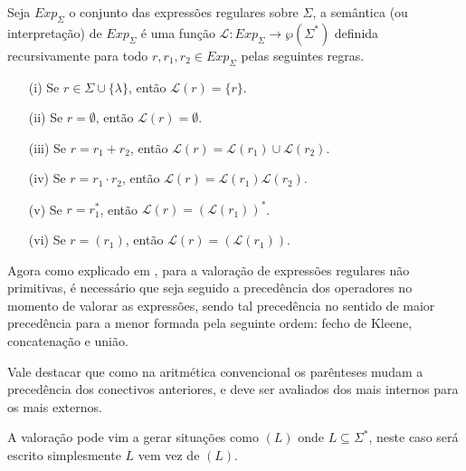 \begin{definition}\label{def:ExpRegularesSemantica}
	Seja $Exp_\Sigma$ o conjunto das expressões regulares sobre $\Sigma$,  a semântica (ou interpretação) de $Exp_\Sigma$ é uma função $\mathcal{L}: Exp_\Sigma \rightarrow \wp(\Sigma^*)$ definida recursivamente para todo $r, r_1, r_2  \in Exp_\Sigma$ pelas seguintes regras.
	\begin{itemize}
		\item[(i)] Se $r \in \Sigma \cup \{\lambda\}$, então $\mathcal{L}(r) = \{r\}$.
		\item[(ii)] Se $r = \emptyset$, então $\mathcal{L}(r) = \emptyset$.
		\item[(iii)] Se $r = r_1 + r_2$, então $\mathcal{L}(r) = \mathcal{L}(r_1) \cup \mathcal{L}(r_2)$.
		\item[(iv)] Se $r = r_1 \cdot r_2$, então $\mathcal{L}(r) = \mathcal{L}(r_1)\mathcal{L}(r_2)$.
		\item[(v)] Se $r = r_1^*$, então $\mathcal{L}(r) = (\mathcal{L}(r_1))^*$.
		\item[(vi)] Se $r = (r_1)$, então $\mathcal{L}(r) = (\mathcal{L}(r_1))$.	
	\end{itemize}
\end{definition}

Agora como explicado em \cite{carroll1989}, para a valoração de expressões regulares não primitivas, é necessário que seja seguido a precedência dos operadores no momento de valorar as expressões, sendo tal precedência no sentido de maior precedência para a menor formada pela seguinte ordem: fecho de Kleene, concatenação e união.

\begin{remark}
	Vale destacar que como na aritmética convencional os parênteses mudam a precedência dos conectivos anteriores, e deve ser avaliados dos mais internos para os mais externos.
\end{remark}

\begin{note}
	A valoração pode vim a gerar situações como $(L)$ onde $L \subseteq \Sigma^*$, neste caso será escrito simplesmente $L$ vem vez de $(L)$.
\end{note}

